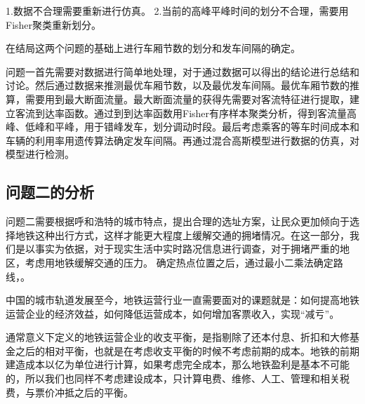 \documentclass[12pt,a4paper]{mcmthesis}
\begin{document}
    1.数据不合理需要重新进行仿真。
    2.当前的高峰平峰时间的划分不合理，需要用Fisher聚类重新划分。

    在结局这两个问题的基础上进行车厢节数的划分和发车间隔的确定。




        {问题一首先需要对数据进行简单地处理，对于通过数据可以得出的结论进行总结和讨论。然后通过数据来推测最优车厢节数，以及最优发车间隔。最优车厢节数的推算，需要用到最大断面流量。最大断面流量的获得先需要对客流特征进行提取，建立客流到达率函数。通过到到达率函数用Fisher有序样本聚类分析，得到客流量高峰、低峰和平峰，用于错峰发车，划分调动时段。最后考虑乘客的等车时间成本和车辆的利用率用遗传算法确定发车间隔。再通过混合高斯模型进行数据的仿真，对模型进行检测。}

    \subsection{问题二的分析}
    问题二需要根据呼和浩特的城市特点，提出合理的选址方案，让民众更加倾向于选择地铁这种出行方式，这样才能更大程度上缓解交通的拥堵情况。在这一部分，我们是以事实为依据，对于现实生活中实时路况信息进行调查，对于拥堵严重的地区，考虑用地铁缓解交通的压力。
    确定热点位置之后，通过最小二乘法确定路线，。

    中国的城市轨道发展至今，地铁运营行业一直需要面对的课题就是：如何提高地铁运营企业的经济效益，如何降低运营成本，如何增加客票收入，实现“减亏”。

    通常意义下定义的地铁运营企业的收支平衡，是指剔除了还本付息、折扣和大修基金之后的相对平衡，也就是在考虑收支平衡的时候不考虑前期的成本。地铁的前期建造成本以亿为单位进行计算，如果考虑完全成本，那么地铁盈利是基本不可能的，所以我们也同样不考虑建设成本，只计算电费、维修、人工、管理和相关税费，与票价冲抵之后的平衡。
\end{document}
